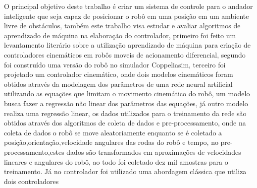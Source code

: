 %
%

O principal objetivo deste trabalho é criar um  sistema de
controle para o andador inteligente que seja capaz de posicionar o robô
em uma posição em um ambiente livre de obstáculos, também 
este trabalho visa estudar e avaliar algoritmos de aprendizado de máquina
na elaboração do controlador, primeiro foi feito um levantamento
literário sobre a utilização aprendizado de máquina para criação de
controladores cinemáticos em robôs moveis de acionamento diferencial,
segundo foi construído uma versão do robô no simulador Coppeliasim,
terceiro foi projetado um controlador cinemático, onde dois modelos
cinemáticos foram obtidos através da modelagem dos parâmetros de uma
rede neural artificial utilizando as equações que limitam o movimento
cinemático do robô, um modelo busca fazer a regressão não linear dos
parâmetros das equações, já outro modelo realiza uma regressão linear,
os dados utilizados para o treinamento da rede são obtidos
através dos algoritmos de coleta de dados e pre-processamento,
onde na coleta de dados o robô se move aleatoriamente enquanto se é
coletado a posição,orientação,velocidade angulares das rodas do robô e
tempo, no pre-processamento,estes dados são transformados em aproximações
de velocidades lineares e angulares do robô, ao todo foi coletado dez mil
amostras para o treinamento. Já no controlador foi utilizado uma abordagem
clássica que utiliza  dois controladores
